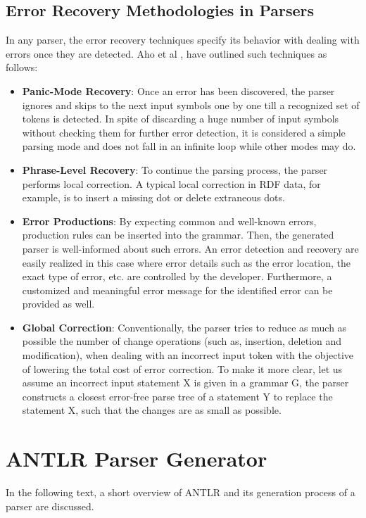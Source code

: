 \subsection{Error Recovery Methodologies in Parsers}
In any parser, the error recovery techniques specify its behavior with dealing with errors once they are detected.  
Aho et al \cite{Aho:2006}, have outlined such techniques as follows:

\begin{itemize}
	\item \textbf{Panic-Mode Recovery}: Once an error has been discovered, the parser ignores and skips to the next input symbols one by one till a recognized set of tokens is detected. 
	In spite of discarding a huge number of input symbols without checking them for further error detection, it is considered a simple parsing mode and does not fall in an infinite loop while other modes may do.
	
	\item \textbf{Phrase-Level Recovery}: To continue the parsing process, the parser performs local correction. A typical local correction in RDF data, for example, is to insert a missing dot or delete extraneous dots.
	
	\item \textbf{Error Productions}: By expecting common and well-known errors, production rules can be inserted into the grammar. 
	Then, the generated parser is well-informed about such errors. An error detection and recovery are easily realized in this case where error details such as the error location, the exact type of error, etc. are controlled by the developer.  
	Furthermore, a customized and meaningful error message for the identified error can be provided as well. 
	
	\item \textbf{Global Correction}: Conventionally, the parser tries to reduce as much as possible the number of change operations (such as, insertion, deletion and modification), when dealing with an incorrect input token with the objective of lowering the total cost of error correction. 
	To make it more clear, let us assume an incorrect input statement X is given in a grammar G, the parser constructs a closest error-free parse tree of a statement Y to replace the statement X, such that the changes are as small as possible. 
\end{itemize}


\section{ANTLR Parser Generator}
In the following text, a short overview of ANTLR and its generation process of a parser are discussed.   
\label{sec:bck_ANTLR}

